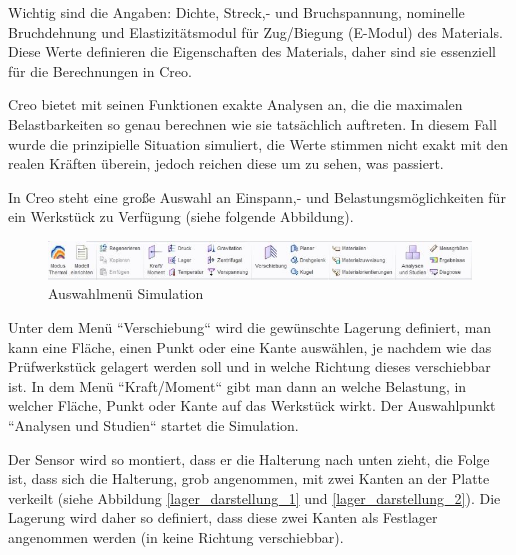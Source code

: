 	Wichtig sind die Angaben: Dichte, Streck,- und Bruchspannung, nominelle Bruchdehnung und Elastizitätsmodul für Zug/Biegung (E-Modul) des Materials.
	Diese Werte definieren die Eigenschaften des Materials, daher sind sie essenziell für die Berechnungen in Creo.

	Creo bietet mit seinen Funktionen exakte Analysen an, die die maximalen Belastbarkeiten so genau berechnen wie sie tatsächlich auftreten.
	In diesem Fall wurde die prinzipielle Situation simuliert, die Werte stimmen nicht exakt mit den realen Kräften überein, jedoch reichen diese um zu sehen, was passiert.

	In Creo steht eine große Auswahl an Einspann,- und Belastungsmöglichkeiten für ein Werkstück zu Verfügung (siehe folgende Abbildung).

			\begin{figure}[H]
			\begin{centering}
			\includegraphics[width = 1\textwidth]{Bilder/auswahl_creo}
			\par\end{centering}
			\caption{Auswahlmenü Simulation}
			\label{auswahl_creo}
			\end{figure}

	Unter dem Menü “Verschiebung“ wird die gewünschte Lagerung definiert, man kann eine Fläche, einen Punkt oder eine Kante auswählen,
	je nachdem wie das Prüfwerkstück gelagert werden soll und in welche Richtung dieses verschiebbar ist.
	In dem Menü “Kraft/Moment“ gibt man dann an welche Belastung, in welcher Fläche, Punkt oder Kante auf das Werkstück wirkt.
	Der Auswahlpunkt “Analysen und Studien“ startet die Simulation.

	Der Sensor wird so montiert, dass er die Halterung nach unten zieht, die Folge ist, dass sich die Halterung, grob angenommen,
	mit zwei Kanten an der Platte verkeilt (siehe Abbildung \ref{lager_darstellung_1} und \ref{lager_darstellung_2}).
	Die Lagerung wird daher so definiert, dass diese zwei Kanten als Festlager angenommen werden (in keine Richtung verschiebbar).

